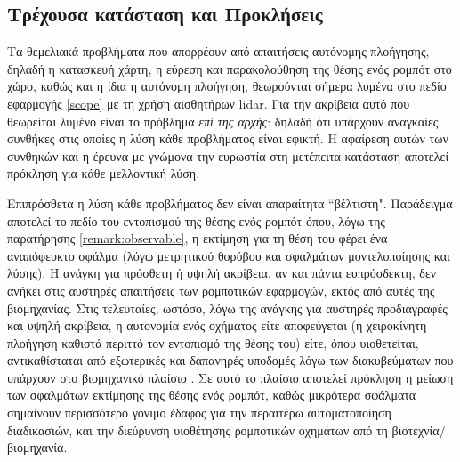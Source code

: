

\subsection{Τρέχουσα κατάσταση και Προκλήσεις}
\label{subsec:01_01_01_3}

Τα θεμελιακά προβλήματα που απορρέουν από απαιτήσεις αυτόνομης πλοήγησης,
δηλαδή η κατασκευή χάρτη, η εύρεση και παρακολούθηση της θέσης ενός ρομπότ στο
χώρο, καθώς και η ίδια η αυτόνομη πλοήγηση, θεωρούνται σήμερα λυμένα στο πεδίο
εφαρμογής \ref{scope} με τη χρήση αισθητήρων lidar. Για την ακρίβεια αυτό που
θεωρείται λυμένο είναι το πρόβλημα \textit{επί της αρχής}: δηλαδή ότι υπάρχουν
αναγκαίες συνθήκες στις οποίες η λύση κάθε προβλήματος είναι εφικτή.  Η
αφαίρεση αυτών των συνθηκών και η έρευνα με γνώμονα την ευρωστία στη μετέπειτα
κατάσταση αποτελεί πρόκληση για κάθε μελλοντική λύση.

Επιπρόσθετα η λύση κάθε προβλήματος δεν είναι απαραίτητα ``βέλτιστη".
Παράδειγμα αποτελεί το πεδίο του εντοπισμού της θέσης ενός ρομπότ όπου, λόγω
της παρατήρησης \ref{remark:observable}, η εκτίμηση για τη θέση του φέρει ένα
αναπόφευκτο σφάλμα (λόγω μετρητικού θορύβου και σφαλμάτων μοντελοποίησης και
λύσης).  H ανάγκη για πρόσθετη ή υψηλή ακρίβεια, αν και πάντα ευπρόσδεκτη, δεν
ανήκει στις αυστηρές απαιτήσεις των ρομποτικών εφαρμογών, εκτός από αυτές της
βιομηχανίας.  Στις τελευταίες, ωστόσο, λόγω της ανάγκης για αυστηρές
προδιαγραφές και υψηλή ακρίβεια, η αυτονομία ενός οχήματος είτε αποφεύγεται
(η χειροκίνητη πλοήγηση καθιστά περιττό τον εντοπισμό της θέσης του) είτε,
όπου υιοθετείται, αντικαθίσταται από εξωτερικές και δαπανηρές υποδομές λόγω των
διακυβεύματων που υπάρχουν στο βιομηχανικό πλαίσιο \cite{Vasiljevic2016a}. Σε
αυτό το πλαίσιο αποτελεί πρόκληση η μείωση των σφαλμάτων εκτίμησης της θέσης
ενός ρομπότ, καθώς μικρότερα σφάλματα σημαίνουν περισσότερο γόνιμο έδαφος για
την περαιτέρω αυτοματοποίηση διαδικασιών, και την διεύρυνση υιοθέτησης
ρομποτικών οχημάτων από τη βιοτεχνία/βιομηχανία.
